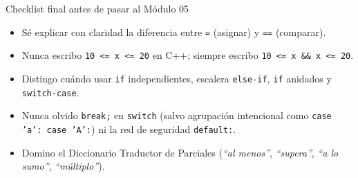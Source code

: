 \documentclass[11pt,letterpaper]{article}
\begin{document}
\begin{consejo}{Checklist final antes de pasar al Módulo 05}
\begin{itemize}
  \item Sé explicar con claridad la diferencia entre \texttt{=} (asignar) y \texttt{==} (comparar).
  \item Nunca escribo \texttt{10 <= x <= 20} en C++; siempre escribo \texttt{10 <= x \&\& x <= 20}.
  \item Distingo cuándo usar \texttt{if} independientes, escalera \texttt{else-if}, \texttt{if} anidados y \texttt{switch-case}.
  \item Nunca olvido \texttt{break;} en \texttt{switch} (salvo agrupación intencional como \texttt{case 'a': case 'A':}) ni la red de seguridad \texttt{default:}.
  \item Domino el Diccionario Traductor de Parciales (\textit{``al menos''}, \textit{``supera''}, \textit{``a lo sumo''}, \textit{``múltiplo''}).
\end{itemize}
\end{consejo}
\end{document}
